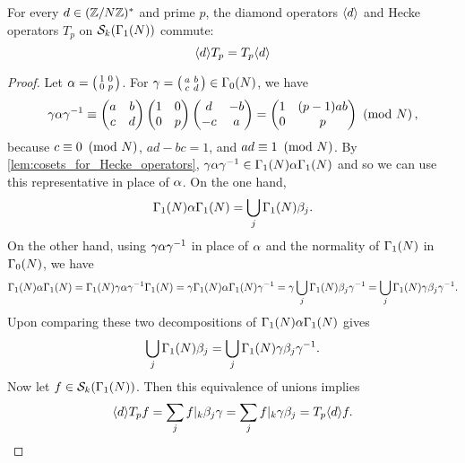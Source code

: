     \begin{proposition}\label{prop:diamond_Hecke_operators_commute_holomorphic}
      For every $d \in (\mathbb{Z}/N\mathbb{Z})^{\ast}$ and prime $p$, the diamond operators $\langle d\rangle$ and Hecke operators $T_{p}$ on $\mathcal{S}_{k}(\Gamma_{1}(N))$ commute:
      \[
        \langle d\rangle T_{p} = T_{p}\langle d\rangle
      \]
    \end{proposition}
    \begin{proof}
      Let $\alpha = \begin{psmallmatrix} 1 & 0 \\ 0 & p \end{psmallmatrix}$. For $\gamma = \begin{psmallmatrix} a & b \\ c & d \end{psmallmatrix} \in \Gamma_{0}(N)$, we have
      \[
        \gamma\alpha\gamma^{-1} \equiv \begin{pmatrix} a & b \\ c & d \end{pmatrix}\begin{pmatrix} 1 & 0 \\ 0 & p \end{pmatrix}\begin{pmatrix} d & -b \\ -c & a \end{pmatrix} = \begin{pmatrix} 1 & (p-1)ab \\ 0 & p \end{pmatrix} \ \left(\text{mod }N\right),
      \]
      because $c \equiv 0 \ \left(\text{mod }N\right)$, $ad-bc = 1$, and $ad \equiv {1} \ \left(\text{mod }N\right)$. By \cref{lem:cosets_for_Hecke_operators}, $\gamma\alpha\gamma^{-1} \in \Gamma_{1}(N)\alpha\Gamma_{1}(N)$ and so we can use this representative in place of $\alpha$. On the one hand,
      \[
        \Gamma_{1}(N)\alpha\Gamma_{1}(N) = \bigcup_{j}\Gamma_{1}(N)\beta_{j}.
      \]
      On the other hand, using $\gamma\alpha\gamma^{-1}$ in place of $\alpha$ and the normality of $\Gamma_{1}(N)$ in $\Gamma_{0}(N)$, we have
      \[
        \Gamma_{1}(N)\alpha\Gamma_{1}(N) = \Gamma_{1}(N)\gamma\alpha\gamma^{-1}\Gamma_{1}(N) = \gamma\Gamma_{1}(N)\alpha\Gamma_{1}(N)\gamma^{-1} = \gamma\bigcup_{j}\Gamma_{1}(N)\beta_{j}\gamma^{-1} = \bigcup_{j}\Gamma_{1}(N)\gamma\beta_{j}\gamma^{-1}.
      \]
      Upon comparing these two decompositions of $\Gamma_{1}(N)\alpha\Gamma_{1}(N)$ gives
      \[
        \bigcup_{j}\Gamma_{1}(N)\beta_{j} = \bigcup_{j}\Gamma_{1}(N)\gamma\beta_{j}\gamma^{-1}.
      \]
      Now let $f \in \mathcal{S}_{k}(\Gamma_{1}(N))$. Then this equivalence of unions implies
      \[
      \langle d\rangle T_{p}f = \sum_{j}f|_{k}\beta_{j}\gamma = \sum_{j}f|_{k}\gamma\beta_{j} = T_{p}\langle d\rangle f.
      \]
    \end{proof}
    
